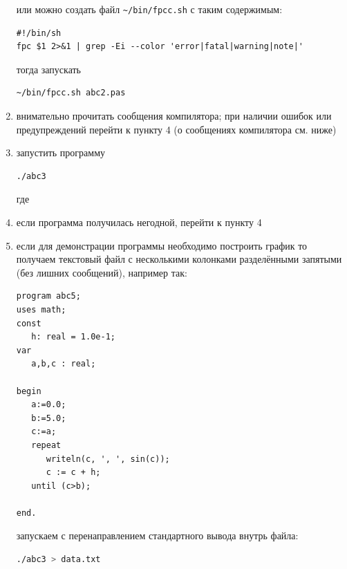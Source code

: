 \documentclass[unicode, 12pt, a4paper,oneside,fleqn]{article}
\begin{document}
\begin{enumerate}
или можно создать файл \verb!~/bin/fpcc.sh! с таким содержимым:

\begin{Verbatim}[fontsize=\footnotesize,frame=single]
#!/bin/sh
fpc $1 2>&1 | grep -Ei --color 'error|fatal|warning|note|'
\end{Verbatim}


тогда запускать 
\begin{lstlisting}[language=bash]
~/bin/fpcc.sh abc2.pas
\end{lstlisting}





\item внимательно прочитать сообщения компилятора; при наличии ошибок
  или предупреждений перейти к пункту 4 (о сообщениях компилятора
  см. ниже)
  
\item запустить программу\\

  
\begin{lstlisting}[language=bash]
./abc3
\end{lstlisting}

  где 


  
\item если программа получилась негодной, перейти к пункту 4

\item если для демонстрации программы необходимо построить график то
  получаем текстовый файл с несколькими колонками разделёнными
  запятыми (без лишних сообщений), например так:

\newpage

\begin{lstlisting}
program abc5;
uses math;
const
   h: real = 1.0e-1;
var 
   a,b,c : real;

begin
   a:=0.0;
   b:=5.0;
   c:=a;
   repeat
      writeln(c, ', ', sin(c));
      c := c + h;
   until (c>b);
   
end.
\end{lstlisting}


запускаем с перенаправлением стандартного вывода внутрь файла:
\begin{lstlisting}[language=bash]
./abc3 > data.txt
\end{lstlisting}


\end{enumerate}
\end{document}
